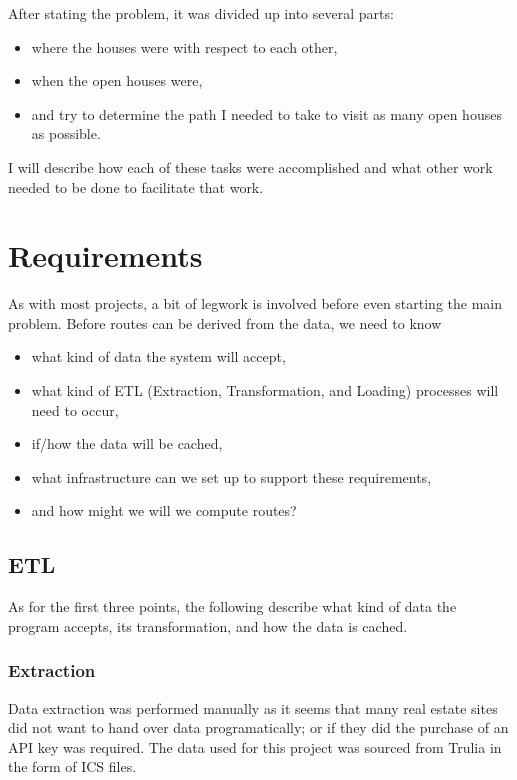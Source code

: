 \documentclass[letterpaper,11pt]{report}
\theoremstyle{definition}
\theoremstyle{definition}
\begin{document}
After stating the problem, it was divided up into several parts:
\begin{itemize}
  \item where the houses were with respect to each other,
  \item when the open houses were,
  \item and try to determine the path I needed to take to visit as many open houses as possible.
\end{itemize}

I will describe how each of these tasks were accomplished and what other work needed to be done to facilitate that work.


\section{Requirements}
As with most projects, a bit of legwork is involved before even starting the main problem. Before routes can be derived from the data, we need to know
\begin{itemize}
  \item what kind of data the system will accept,
  \item what kind of ETL (Extraction, Transformation, and Loading) processes will need to occur,
  \item if/how the data will be cached,
  \item what infrastructure can we set up to support these requirements,
  \item and how might we will we compute routes?
\end{itemize}

\subsection{ETL}
As for the first three points, the following describe what kind of data the program accepts, its transformation, and how the data is cached.

\subsubsection{Extraction}\label{E}
Data extraction was performed manually as it seems that many real estate sites did not want to hand over data programatically; or if they did the purchase of an API key was required. The data used for this project was sourced from Trulia\cite{Trulia} in the form of ICS files\cite{ICS}.
\end{document}
